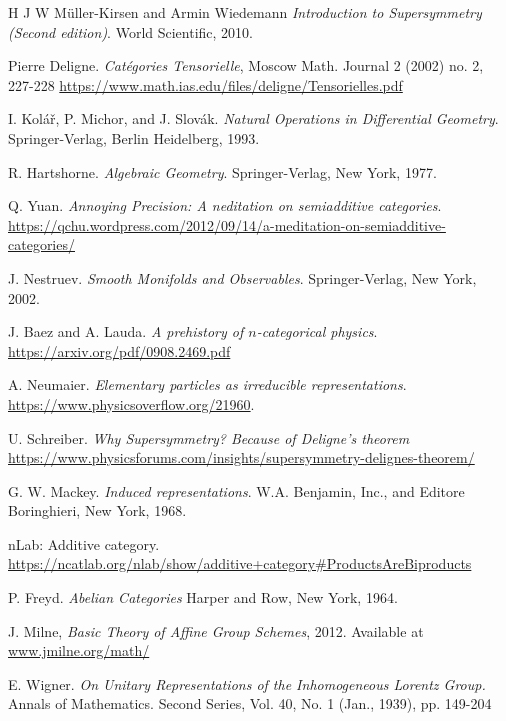 \documentclass[a4paper,10pt]{scrreprt}
\theoremstyle{definition}
\theoremstyle{plain}
\theoremstyle{remark}
\begin{document}
\begin{thebibliography}{9}
   H J W M{\"u}ller-Kirsen and Armin Wiedemann
    \textit{Introduction to Supersymmetry (Second edition)}.
    World Scientific, 2010.

   Pierre Deligne.
    \textit{Cat{\'e}gories Tensorielle},
    Moscow Math. Journal 2 (2002) no. 2, 227-228
    \url{https://www.math.ias.edu/files/deligne/Tensorielles.pdf}

   I. Kol\'{a}\v{r}, P. Michor, and J. Slov\'{a}k.
    \textit{Natural Operations in Differential Geometry}.
    Springer-Verlag, Berlin Heidelberg, 1993.

   R. Hartshorne.
    \textit{Algebraic Geometry}.
    Springer-Verlag, New York, 1977.

   Q. Yuan.
    \textit{Annoying Precision: A neditation on semiadditive categories}.
    \url{https://qchu.wordpress.com/2012/09/14/a-meditation-on-semiadditive-categories/}

   J. Nestruev.
    \textit{Smooth Monifolds and Observables}.
    Springer-Verlag, New York, 2002.

   J. Baez and A. Lauda. 
    \textit{A prehistory of $n$-categorical physics}.
    \url{https://arxiv.org/pdf/0908.2469.pdf}

   A. Neumaier.
    \textit{Elementary particles as irreducible representations}.
    \url{https://www.physicsoverflow.org/21960}.

   U. Schreiber.
    \textit{Why Supersymmetry? Because of Deligne's theorem}
    \url{https://www.physicsforums.com/insights/supersymmetry-delignes-theorem/}

   G. W. Mackey.
    \textit{Induced representations}.
    W.A. Benjamin, Inc., and Editore Boringhieri, New York, 1968.

   nLab: Additive category.
    \url{https://ncatlab.org/nlab/show/additive+category#ProductsAreBiproducts}

   P. Freyd.
    \textit{Abelian Categories}
    Harper and Row, New York, 1964.

   J. Milne,
    \textit{Basic Theory of Affine Group Schemes},
    2012. 
    Available at \url{www.jmilne.org/math/}

   E. Wigner.
    \textit{On Unitary Representations of the Inhomogeneous Lorentz Group.}
    Annals of Mathematics. Second Series, Vol. 40, No. 1 (Jan., 1939), pp. 149-204
\end{thebibliography}
\end{document}
